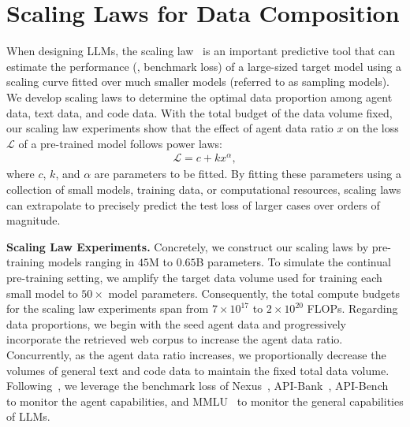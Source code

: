 \section{Scaling Laws for Data Composition}
\label{sec:data-phase4}

When designing LLMs, the scaling law~\cite{kaplan2020scaling, hoffmann2022training} is an important predictive tool that can estimate the performance (\eg, benchmark loss) of a large-sized target model using a scaling curve fitted over much smaller models (referred to as sampling models).
We develop scaling laws to determine the optimal data proportion among agent data, text data, and code data. With the total budget of the data volume fixed, our scaling law experiments show that the effect of agent data ratio $x$ on the loss $\mathcal{L}$ of a pre-trained model follows power laws:
\begin{equation*}
    \begin{aligned}
        \mathcal{L}=c+kx^{\alpha},
    \end{aligned}
\end{equation*}
where $c$, $k$, and $\alpha$ are parameters to be fitted.
By fitting these parameters using a collection of small models, training data, or computational resources, scaling laws can extrapolate to precisely predict the test loss of larger cases over orders of magnitude.

\noindent\textbf{Scaling Law Experiments.}
Concretely, we construct our scaling laws by pre-training models ranging in $45$M to $0.65$B parameters.
To simulate the continual pre-training setting, we amplify the target data volume used for training each small model to $50\times$ model parameters.
Consequently, the total compute budgets for the scaling law experiments span from $7\times10^{17}$ to $2\times10^{20}$ FLOPs.
Regarding data proportions, we begin with the seed agent data and progressively incorporate the retrieved web corpus to increase the agent data ratio. Concurrently, as the agent data ratio increases, we proportionally decrease the volumes of general text and code data to maintain the fixed total data volume.
Following~\citet{dubey2024llama}, we leverage the benchmark loss of Nexus~\cite{srinivasan2023nexusraven}, API-Bank~\cite{li2023api}, API-Bench~\cite{patil2023gorilla} to monitor the agent capabilities, and MMLU~\cite{hendrycks2020measuring} to monitor the general capabilities of LLMs.

